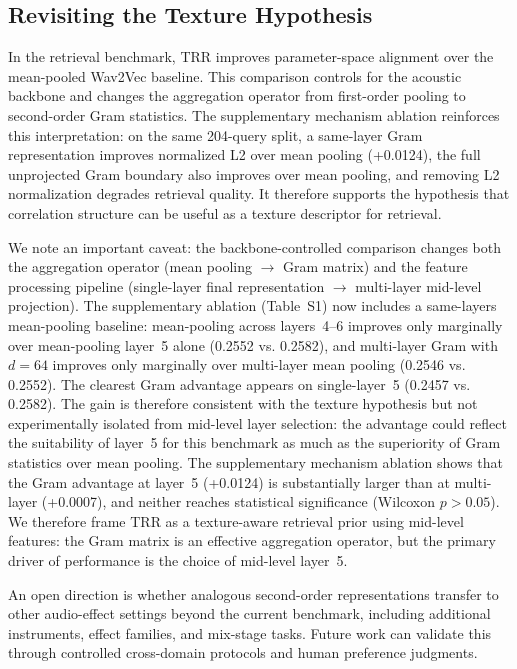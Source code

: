 \subsection{Revisiting the Texture Hypothesis}

In the retrieval benchmark, TRR improves parameter-space alignment over the mean-pooled Wav2Vec baseline. This comparison controls for the acoustic backbone and changes the aggregation operator from first-order pooling to second-order Gram statistics. The supplementary mechanism ablation reinforces this interpretation: on the same 204-query split, a same-layer Gram representation improves normalized L2 over mean pooling (+0.0124), the full unprojected Gram boundary also improves over mean pooling, and removing L2 normalization degrades retrieval quality. It therefore supports the hypothesis that correlation structure can be useful as a texture descriptor for retrieval.

We note an important caveat: the backbone-controlled comparison changes both the aggregation operator (mean pooling $\rightarrow$ Gram matrix) and the feature processing pipeline (single-layer final representation $\rightarrow$ multi-layer mid-level projection). The supplementary ablation (Table~S1) now includes a same-layers mean-pooling baseline: mean-pooling across layers~4--6 improves only marginally over mean-pooling layer~5 alone (0.2552 vs. 0.2582), and multi-layer Gram with $d=64$ improves only marginally over multi-layer mean pooling (0.2546 vs. 0.2552). The clearest Gram advantage appears on single-layer~5 (0.2457 vs. 0.2582). The gain is therefore consistent with the texture hypothesis but not experimentally isolated from mid-level layer selection: the advantage could reflect the suitability of layer~5 for this benchmark as much as the superiority of Gram statistics over mean pooling. The supplementary mechanism ablation shows that the Gram advantage at layer~5 (+0.0124) is substantially larger than at multi-layer (+0.0007), and neither reaches statistical significance (Wilcoxon $p > 0.05$). We therefore frame TRR as a texture-aware retrieval prior using mid-level features: the Gram matrix is an effective aggregation operator, but the primary driver of performance is the choice of mid-level layer~5.

An open direction is whether analogous second-order representations transfer to other audio-effect settings beyond the current benchmark, including additional instruments, effect families, and mix-stage tasks. Future work can validate this through controlled cross-domain protocols and human preference judgments.

